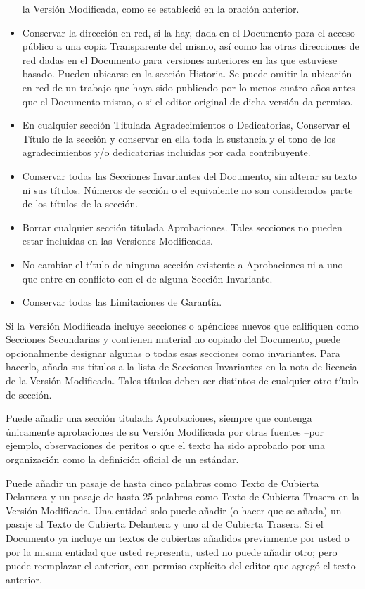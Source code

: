 \begin{itemize}
la Versión Modificada, como se estableció en la oración anterior.
\item Conservar la dirección en red, si la hay, dada en el Documento para
el acceso público a una copia Transparente del mismo, así como las
otras direcciones de red dadas en el Documento para versiones anteriores
en las que estuviese basado. Pueden ubicarse en la sección Historia.
Se puede omitir la ubicación en red de un trabajo que haya sido publicado
por lo menos cuatro años antes que el Documento mismo, o si el editor
original de dicha versión da permiso.
\item En cualquier sección Titulada Agradecimientos o Dedicatorias, Conservar
el Título de la sección y conservar en ella toda la sustancia y el
tono de los agradecimientos y/o dedicatorias incluidas por cada contribuyente.
\item Conservar todas las Secciones Invariantes del Documento, sin alterar
su texto ni sus títulos. Números de sección o el equivalente no son
considerados parte de los títulos de la sección.
\item Borrar cualquier sección titulada Aprobaciones. Tales secciones no
pueden estar incluidas en las Versiones Modificadas.
\item No cambiar el título de ninguna sección existente a Aprobaciones ni
a uno que entre en conflicto con el de alguna Sección Invariante.
\item Conservar todas las Limitaciones de Garantía.
\end{itemize}
Si la Versión Modificada incluye secciones o apéndices nuevos que
califiquen como Secciones Secundarias y contienen material no copiado
del Documento, puede opcionalmente designar algunas o todas esas secciones
como invariantes. Para hacerlo, añada sus títulos a la lista de Secciones
Invariantes en la nota de licencia de la Versión Modificada. Tales
títulos deben ser distintos de cualquier otro título de sección.

Puede añadir una sección titulada Aprobaciones, siempre que contenga
únicamente aprobaciones de su Versión Modificada por otras fuentes
–por ejemplo, observaciones de peritos o que el texto ha sido aprobado
por una organización como la definición oficial de un estándar.

Puede añadir un pasaje de hasta cinco palabras como Texto de Cubierta
Delantera y un pasaje de hasta 25 palabras como Texto de Cubierta
Trasera en la Versión Modificada. Una entidad solo puede añadir (o
hacer que se añada) un pasaje al Texto de Cubierta Delantera y uno
al de Cubierta Trasera. Si el Documento ya incluye un textos de cubiertas
añadidos previamente por usted o por la misma entidad que usted representa,
usted no puede añadir otro; pero puede reemplazar el anterior, con
permiso explícito del editor que agregó el texto anterior.

